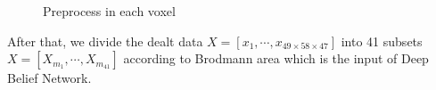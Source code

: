 \documentclass[10pt,twocolumn,letterpaper]{article}
\begin{document}
\begin{figure}[ht]
\begin{center}
   \caption{Preprocess in each voxel}
\end{center}
\end{figure}
After that, we divide the dealt data $X=[x_1,\cdots,x_{49\times58\times47}]$ into 41 subsets $X=[X_{m_1},\cdots,X_{m_41}]$ according to Brodmann area which is the input of Deep Belief Network. 
\end{document}

